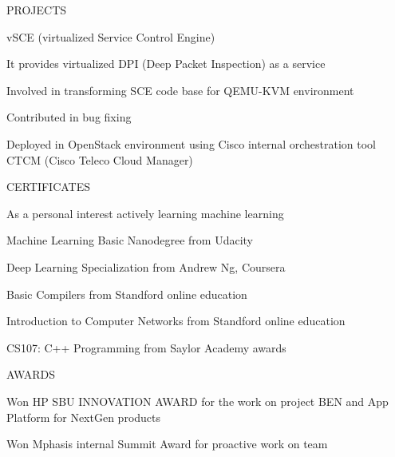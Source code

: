 \documentclass{resume} %
\begin{document}
\begin{rSection}{PROJECTS}
\begin{rSubsection}{vSCE (virtualized Service Control Engine)}
\vspace{-3pt}

\item It provides virtualized DPI (Deep Packet Inspection) as a service
\item Involved in transforming SCE code base for QEMU-KVM environment
\item Contributed in bug fixing
\item Deployed in OpenStack environment using Cisco internal orchestration tool CTCM (Cisco Teleco Cloud Manager)

\end{rSubsection}




\end{rSection} 

\vspace{-10pt}
\begin{rSection}{CERTIFICATES} \itemsep -1pt  

\begin{rSubsection}{}{ }{}    

\vspace{-8pt}

\item As a personal interest actively learning machine learning
\item Machine Learning Basic Nanodegree from Udacity
\item Deep Learning Specialization from Andrew Ng, Coursera
\item Basic Compilers from Standford online education
\item Introduction to Computer Networks from Standford online education
\item CS107: C++ Programming from Saylor Academy awards
\end{rSubsection} 


\end{rSection}  


  
\begin{rSection}{AWARDS}

\begin{rSubsection}{}{}{}{}              
\item Won HP SBU INNOVATION AWARD for the work on project BEN and App Platform for NextGen products
\item Won Mphasis internal Summit Award for proactive work on team
\end{rSubsection}  

\end{rSection}
  
\end{document}
